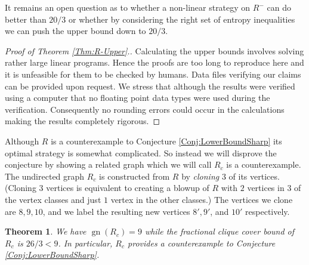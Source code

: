 \documentclass[a4paper, 14pt]{extarticle}
\theoremstyle{plain}
\newtheorem{theorem}[proposition]{Theorem}
\DeclareMathOperator{\gn}{gn}
\begin{document}
It remains an open question as to whether a non-linear
strategy on $R^-$ can do better than $20/3$ or whether by
considering the right set of entropy inequalities we can push the
upper bound down to $20/3$.

\begin{proof}[Proof of Theorem \ref{Thm:R-Upper}.]
Calculating the upper bounds involves solving rather large linear
programs. Hence the proofs are too long to reproduce here and it is
unfeasible for them to be checked by humans. Data files verifying
our claims can be provided upon request. We stress that although the
results were verified using a computer that no floating point data
types were used during the verification. Consequently no rounding
errors could occur in the calculations making the results completely
rigorous.
\end{proof}

Although $R$ is a counterexample to Conjecture
\ref{Conj:LowerBoundSharp} its optimal strategy is somewhat
complicated. So instead we will disprove the conjecture by showing a
related graph which we will call $R_{c}$ is a counterexample. The
undirected graph $R_c$ is constructed from $R$ by \emph{cloning} $3$
of its vertices. (Cloning $3$ vertices is equivalent to creating a
blowup of $R$ with $2$ vertices in $3$ of the vertex classes and
just $1$ vertex in the other classes.) The vertices we clone are $8,
9, 10$, and we label the resulting new vertices $8', 9'$, and $10'$
respectively.

\begin{theorem} \label{Thm:Rc}
We have $\gn(R_c) = 9$ while the fractional clique cover bound of $R_c$ is
$26/3 < 9$. In particular, $R_c$ provides a counterexample to Conjecture \ref{Conj:LowerBoundSharp}.
\end{theorem}
\end{document}
